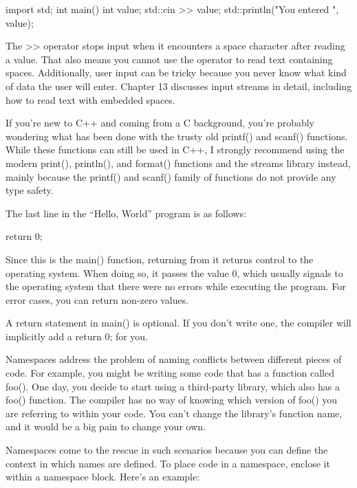 \begin{cpp}
import std;
int main()
{
    int value;
    std::cin >> value;
    std::println("You entered {}", value);
}
\end{cpp}

The >{}> operator stops input when it encounters a space character after reading a value. That also means you cannot use the operator to read text containing spaces. Additionally, user input can be tricky because you never know what kind of data the user will enter. Chapter 13 discusses input streams in detail, including how to read text with embedded spaces.

If you’re new to C++ and coming from a C background, you’re probably wondering what has been done with the trusty old printf() and scanf() functions. While these functions can still be used in C++, I strongly recommend using the modern print(), println(), and format() functions and the streams library instead, mainly because the printf() and scanf() family of functions do not provide any type safety.


The last line in the “Hello, World” program is as follows:

\begin{cpp}
return 0;
\end{cpp}

Since this is the main() function, returning from it returns control to the operating system. When doing so, it passes the value 0, which usually signals to the operating system that there were no errors while executing the program. For error cases, you can return non-zero values.

A return statement in main() is optional. If you don’t write one, the compiler will implicitly add a return 0; for you.


Namespaces address the problem of naming conflicts between different pieces of code. For example, you might be writing some code that has a function called foo(). One day, you decide to start using a third-party library, which also has a foo() function. The compiler has no way of knowing which version of foo() you are referring to within your code. You can’t change the library’s function name, and it would be a big pain to change your own.

Namespaces come to the rescue in such scenarios because you can define the context in which names are defined. To place code in a namespace, enclose it within a namespace block. Here’s an example:

